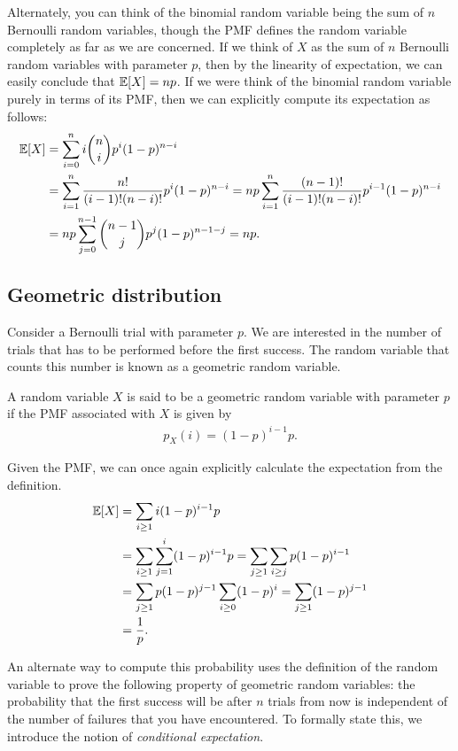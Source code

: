 Alternately, you can think of the binomial random variable being the sum of $n$ Bernoulli random variables, though the PMF defines the random variable completely as far as we are concerned. If we think of $X$ as the sum of $n$ Bernoulli random variables with parameter $p$, then by the linearity of expectation, we can easily conclude that $\mathbb{E}[X]=np$. If we were think of the binomial random variable purely in terms of its PMF, then we can explicitly compute its expectation as follows:
\begin{align*}
	\mathbb{E}[X] &= \sum_{i=0}^n i \binom{n}{i} p^i (1-p)^{n-i}\\
	&= \sum_{i=1}^n \frac{n!}{(i-1)!(n-i)!} p^i (1-p)^{n-i} = np\sum_{i=1}^n \frac{(n-1)!}{(i-1)!(n-i)!}p^{i-1}(1-p)^{n-i}\\
	&=np\sum_{j=0}^{n-1} \binom{n-1}{j}p^j(1-p)^{n-1-j} = np.
\end{align*}

\subsection{Geometric distribution}

Consider a Bernoulli trial with parameter $p$. We are interested in the number of trials that has to be performed before the first success. The random variable that counts this number is known as a geometric random variable.

\begin{definition}
	A random variable $X$ is said to be a geometric random variable with parameter $p$ if the PMF associated with $X$ is given by
	\begin{align*}
		p_X(i) = (1-p)^{i-1} p.
	\end{align*}
\end{definition}

Given the PMF, we can once again explicitly calculate the expectation from the definition.
\begin{align*}
	\mathbb{E}[X] &= \sum_{i\geq 1} i (1-p)^{i-1}p \\
	&= \sum_{i \geq 1} \sum_{j=1}^i (1-p)^{i-1} p = \sum_{j\geq 1} \sum_{i\geq j} p(1-p)^{i-1}\\
	&= \sum_{j \geq 1} p(1-p)^{j-1} \sum_{i\geq 0} (1-p)^{i} = \sum_{j \geq 1} (1-p)^{j-1}\\
	&= \frac{1}{p}.
\end{align*}

An alternate way to compute this probability uses the definition of the random variable to prove the following property of geometric random variables: the probability that the first success will be after $n$ trials from now is independent of the number of failures that you have encountered. To formally state this, we introduce the notion of \emph{conditional expectation}.

